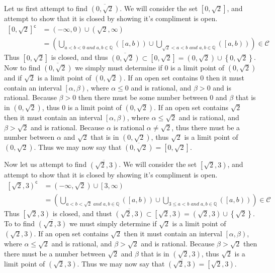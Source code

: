 \documentclass{article}
\let\mathcrl\mathscr
\let\union\cup
\let\bigunion\bigcup
\def\And{\textit{ and }}
\newcommand{\setcomp}[1]{{#1}^{\mathsf{c}}}
\newcommand{\unionfrom}[3]{\bigunion\limits_{#1}^{#2} \left( {#3} \right)}
\newcommand{\unionacross}[2]{\unionfrom{#1}{}{#2}}
\newcommand{\set}[1]{\left\{ {#1} \right\}}
\newcommand{\closure}[1]{\overline{#1}}
\newcommand{\ooint}[2]{\left( #1 , #2 \right)}
\newcommand{\coint}[2]{\left[ #1 , #2 \right)}
\newcommand{\ccint}[2]{\left[ #1 , #2 \right]}
\begin{document}
Let us first attempt to find $\closure{\ooint{0}{\sqrt2}}$. We will consider the set $\ccint0{\sqrt2}$, and attempt to show that it is closed by showing it's compliment is open.
\begin{align*}
\setcomp{\ccint0{\sqrt2}} &= \ooint{-\infty}0 \union \ooint{\sqrt2}{\infty} \\
&= \left(\unionacross{a<b<0 \And a,b \in \mathbb Q}{\coint ab} \union \unionacross{\sqrt2<a<b \And a,b \in \mathbb Q}{\coint ab}\right) \in \mathcrl C
\end{align*}
Thus $\ccint 0{\sqrt2}$ is closed, and thus $\closure{\ooint0{\sqrt2}}\subset\ccint0{\sqrt2}=\ooint{0}{\sqrt2}\union\set{0,\sqrt2}$. Now to find $\closure{\ooint{0}{\sqrt2}}$ we simply must determine if $0$ is a limit point of $\ooint 0{\sqrt2}$ and if $\sqrt2$ is a limit point of $\ooint 0{\sqrt2}$. If an open set contains $0$ then it must contain an interval $\coint\alpha\beta$, where $\alpha\le 0$ and is rational, and $\beta>0$ and is rational. Because $\beta > 0$ then there must be some number between $0$ and $\beta$ that is in $\ooint 0{\sqrt2}$, thus $0$ is a limit point of $\ooint 0{\sqrt2}$. If an open set contains $\sqrt2$ then it must contain an interval $\coint\alpha\beta$, where $\alpha\le\sqrt2$ and is rational, and $\beta>\sqrt2$ and is rational. Because $\alpha$ is rational $\alpha\not=\sqrt2$, thus there must be a number between $\alpha$ and $\sqrt2$ that is in $\ooint0{\sqrt2}$, thus $\sqrt2$ is a limit point of $\ooint 0{\sqrt2}$. Thus we may now say that $\closure{\ooint0{\sqrt2}} = \ccint{0}{\sqrt2}$.

Now let us attempt to find $\closure{\ooint{\sqrt2}3}$. We will consider the set $\coint{\sqrt2}3$, and attempt to show that it is closed by showing it's compliment is open.
\begin{align*}
\setcomp{\coint{\sqrt2}3} &= \ooint{-\infty}{\sqrt2} \union \coint3\infty \\
&=\left(\unionacross{a<b<\sqrt2\And a,b\in\mathbb Q}{\coint ab} \union \unionacross{3 \le a < b \And a,b\in\mathbb Q}{\coint ab}\right) \in \mathcrl C
\end{align*}
Thus $\coint{\sqrt2}3$ is closed, and thust $\closure{\ooint{\sqrt2}3} \subset \coint{\sqrt2}3 = \ooint{\sqrt2}3\union\set{\sqrt2}$. To to find $\closure{\ooint{\sqrt2}3}$ we must simply determine if $\sqrt2$ is a limit point of $\ooint{\sqrt2}3$. If an open set contains $\sqrt2$ then it must contain an interval $\coint\alpha\beta$, where $\alpha\le\sqrt2$ and is rational, and $\beta>\sqrt2$ and is rational. Because $\beta > \sqrt2$ then there must be a number between $\sqrt2$ and $\beta$ that is in $\ooint{\sqrt2}3$, thus $\sqrt2$ is a limit point of $\ooint{\sqrt2}3$. Thus we may now say that $\closure{\ooint{\sqrt2}3}=\coint{\sqrt2}3$.
\end{document}
